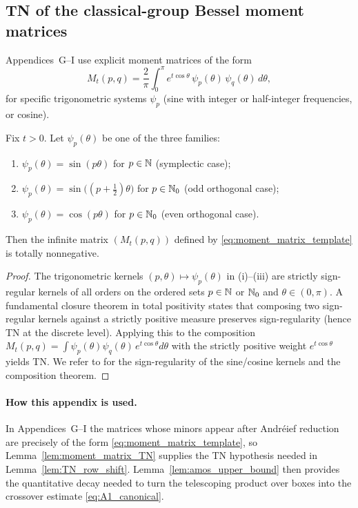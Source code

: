 \subsection{TN of the classical-group Bessel moment matrices}
\label{subsec:TP_tools_moment_matrices}

Appendices~G--I use explicit moment matrices of the form
\begin{equation}
\label{eq:moment_matrix_template}
M_t(p,q)=\frac{2}{\pi}\int_0^{\pi} e^{t\cos\theta}\,\psi_p(\theta)\,\psi_q(\theta)\,d\theta,
\end{equation}
for specific trigonometric systems $\psi_p$ (sine with integer or half-integer frequencies, or cosine).

\begin{lemma}
\label{lem:moment_matrix_TN}
Fix $t>0$.
Let $\psi_p(\theta)$ be one of the three families:
\begin{enumerate}[label=(\roman*)]
\item $\psi_p(\theta)=\sin(p\theta)$ for $p\in\mathbb N$ (symplectic case);
\item $\psi_p(\theta)=\sin\big((p+\tfrac12)\theta\big)$ for $p\in\mathbb N_0$ (odd orthogonal case);
\item $\psi_p(\theta)=\cos(p\theta)$ for $p\in\mathbb N_0$ (even orthogonal case).
\end{enumerate}
Then the infinite matrix $(M_t(p,q))$ defined by \eqref{eq:moment_matrix_template} is totally nonnegative.
\end{lemma}

\begin{proof}
The trigonometric kernels $(p,\theta)\mapsto \psi_p(\theta)$ in (i)--(iii) are strictly sign-regular kernels of all orders
on the ordered sets $p\in\mathbb N$ or $\mathbb N_0$ and $\theta\in(0,\pi)$.
A fundamental closure theorem in total positivity states that composing two sign-regular kernels against a strictly positive measure
preserves sign-regularity (hence TN at the discrete level).
Applying this to the composition
\(M_t(p,q)=\int \psi_p(\theta)\psi_q(\theta)\,e^{t\cos\theta}d\theta\)
with the strictly positive weight $e^{t\cos\theta}$ yields TN.
We refer to \cite[Vol.~I, Ch.~3]{Karlin1968} for the sign-regularity of the sine/cosine kernels and the composition theorem.
\end{proof}

\paragraph{How this appendix is used.}
In Appendices~G--I the matrices whose minors appear after Andr\'eief reduction are precisely of the form \eqref{eq:moment_matrix_template},
so Lemma~\ref{lem:moment_matrix_TN} supplies the TN hypothesis needed in Lemma~\ref{lem:TN_row_shift}.
Lemma~\ref{lem:amos_upper_bound} then provides the quantitative decay needed to turn the telescoping product over boxes
into the crossover estimate \eqref{eq:A1_canonical}.

